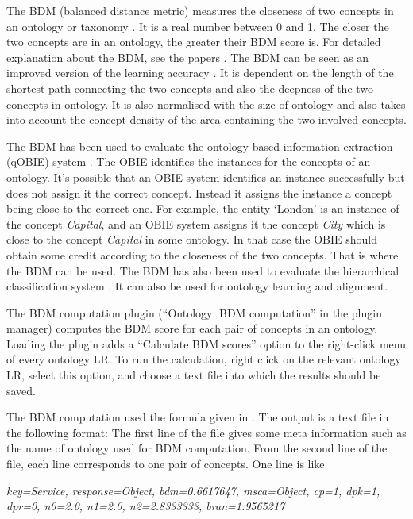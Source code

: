 The BDM (balanced distance metric) measures the closeness of two
concepts in an ontology or taxonomy \cite{Maynard05a,Maynard06a}. It
is a real number between 0 and 1. The closer the two concepts are in
an ontology, the greater their BDM score is.  For detailed explanation
about the BDM, see the papers \cite{Maynard05a,Maynard06a}.  The BDM
can be seen as an improved version of the learning
accuracy \cite{Cim03b}.  It is dependent on the length of the shortest
path connecting the two concepts and also the deepness of the two
concepts in ontology. It is also normalised with the size of ontology
and also takes into account the concept density of the area containing
the two involved concepts.

The BDM has been used to evaluate the ontology based information
extraction (qOBIE) system \cite{Maynard06a}. The OBIE identifies the
instances for the concepts of an ontology. It's possible that an OBIE
system identifies an instance successfully but does not assign it the
correct concept. Instead it assigns the instance a concept being close
to the correct one.  For example, the entity `London' is an instance
of the concept {\em Capital}, and an OBIE system assigns it the
concept {\em City} which is close to the concept {\em Capital} in some
ontology.  In that case the OBIE should obtain some credit according
to the closeness of the two concepts.  That is where the BDM can be
used. The BDM has also been used to evaluate the hierarchical
classification system \cite{Yaoyong07a}. It can also be used for
ontology learning and alignment.

The BDM computation plugin (``Ontology: BDM computation'' in the plugin
manager) computes the BDM score for each pair of concepts in an ontology.
Loading the plugin adds a ``Calculate BDM scores'' option to the right-click
menu of every ontology LR.  To run the calculation, right click on the relevant
ontology LR, select this option, and choose a text file into which the results
should be saved.

The BDM computation used the formula given in \cite{Maynard06a}.  The
output is a text file in the following format: The first line of the
file gives some meta information such as the name of ontology used
for BDM computation. From the second line of the file, each line
corresponds to one pair of concepts. One line is like

{\em key=Service, response=Object, bdm=0.6617647, msca=Object, cp=1,
dpk=1, dpr=0, n0=2.0, n1=2.0, n2=2.8333333, bran=1.9565217}

